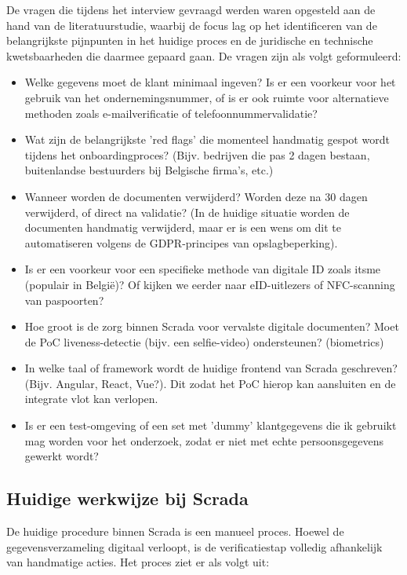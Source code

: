 De vragen die tijdens het interview gevraagd werden waren opgesteld aan de hand van de literatuurstudie, waarbij de focus lag op het identificeren van de belangrijkste pijnpunten in het huidige proces en de juridische en technische kwetsbaarheden die daarmee gepaard gaan.
De vragen zijn als volgt geformuleerd:
\begin{itemize}
    \item Welke gegevens moet de klant minimaal ingeven? Is er een voorkeur voor het gebruik van het ondernemingsnummer, of is er ook ruimte voor alternatieve methoden zoals e-mailverificatie of telefoonnummervalidatie?
    \item Wat zijn de belangrijkste 'red flags' die momenteel handmatig gespot wordt tijdens het onboardingproces? (Bijv. bedrijven die pas 2 dagen bestaan, buitenlandse bestuurders bij Belgische firma's, etc.)
    \item Wanneer worden de documenten verwijderd? Worden deze na 30 dagen verwijderd, of direct na validatie? (In de huidige situatie worden de documenten handmatig verwijderd, maar er is een wens om dit te automatiseren volgens de GDPR-principes van opslagbeperking).
    \item Is er een voorkeur voor een specifieke methode van digitale ID zoals itsme (populair in België)? Of kijken we eerder naar eID-uitlezers of NFC-scanning van paspoorten?
    \item Hoe groot is de zorg binnen Scrada voor vervalste digitale documenten? Moet de PoC liveness-detectie (bijv. een selfie-video) ondersteunen? (biometrics)
    \item In welke taal of framework wordt de huidige frontend van Scrada geschreven? (Bijv. Angular, React, Vue?). Dit zodat het PoC hierop kan aansluiten en de integrate vlot kan verlopen.
    \item Is er een test-omgeving of een set met 'dummy' klantgegevens die ik gebruikt mag worden voor het onderzoek, zodat er niet met echte persoonsgegevens gewerkt wordt?
\end{itemize}

\subsection{Huidige werkwijze bij Scrada}
De huidige procedure binnen Scrada is een manueel proces. Hoewel de gegevensverzameling digitaal verloopt, is de verificatiestap volledig afhankelijk van handmatige acties. Het proces ziet er als volgt uit:

